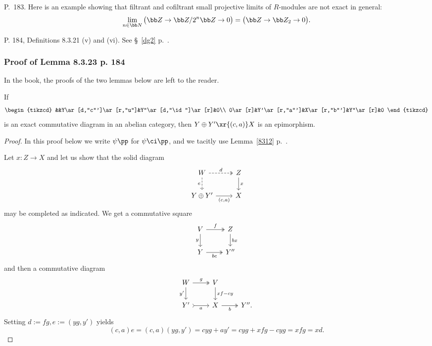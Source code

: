 \documentclass[12pt]{article}
\theoremstyle{remark}
\theoremstyle{definition}
\begin{document}
%

\begin{s} 
P.~183. Here is an example showing that filtrant and cofiltrant small projective limits of $R$-modules are not exact in general: 
$$
\lim_{n\in\bb N}\big(\bb Z\to\bb Z/2^n\bb Z\to0\big)=\big(\bb Z\to\bb Z_2\to0\big).
$$
\end{s} 

% 

\begin{s} 
P. 184, Definitions 8.3.21 (v) and (vi). See \S~\ref{dg2} p.~.
\end{s} 


\subsubsection{Proof of Lemma 8.3.23 p. 184}

In the book, the proofs of the two lemmas below are left to the reader. 

\begin{lem}
If 
$$
\begin{tikzcd}
&&Y\ar[d,"c"']\ar[r,"u"]&Y''\ar[d,"\id"]\ar[r]&0\\ 
0\ar[r]&Y'\ar[r,"a"']&X\ar[r,"b"']&Y''\ar[r]&0
\end{tikzcd}
$$ 
is an exact commutative diagram in an abelian category, then $Y\oplus Y'\xr{(c,a)}X$ is an epimorphism. 
\end{lem}

\begin{proof}
In this proof below we write $\psi\pp$ for $\psi\ci\pp$, and we tacitly use Lemma~\ref{8312} p.~. 

Let $x:Z\to X$ and let us show that the solid diagram 
$$
\begin{tikzcd}
W\ar[d,"e"',dashed]\ar[r,"d",dashed,two heads]&Z\ar[d,"x"]\\ 
Y\oplus Y'\ar{r}[swap]{(c,a)}&X
\end{tikzcd}
$$ 
may be completed as indicated. We get a commutative square 
$$
\begin{tikzcd}
V\ar[d,"y"']\ar[r,"f",two heads]&Z\ar[d,"bx"]\\ 
Y\ar[r,"bc"',two heads]&Y''
\end{tikzcd}
$$ 
and then a commutative diagram 
$$
\begin{tikzcd}
W\ar[d,"y'"']\ar[r,"g",two heads]&V\ar[d,"xf-cy"]\\ 
Y'\ar[r,"a"',rightarrowtail]&X\ar[r,"b"',two heads]&Y''.
\end{tikzcd}
$$ 
Setting $d:=fg,e:=(yg,y')$ yields %
$$
(c,a)e=(c,a)(yg,y')=cyg+ay'=cyg+xfg-cyg=xfg=xd.
$$ 
\end{proof}
\end{document}
